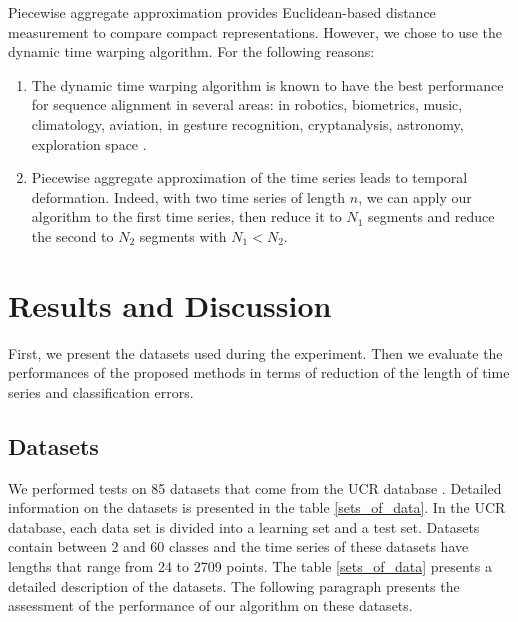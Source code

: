 Piecewise aggregate approximation provides Euclidean-based distance measurement to compare compact representations. However, we chose to use the dynamic time warping algorithm. For the following reasons:
\begin{enumerate}
\item The dynamic time warping algorithm  is known to have the best performance for sequence alignment in several areas:
in robotics, biometrics, music, climatology, aviation, in gesture recognition, cryptanalysis, astronomy, exploration
space \cite{Rakthanmanon2012}.
\item Piecewise aggregate approximation of the time series leads to temporal deformation. Indeed,
with two time series of length $ n $, we can apply our algorithm to the
 first time series, then reduce it to $ N_{1} $ segments and reduce the second to $ N_{2} $
 segments with $ N_{1} <N_{2} $.
\end{enumerate}


\section{Results and Discussion}
\label{results} 
 First, we present the datasets used during the experiment.
 Then we evaluate the performances of the proposed methods in terms of  reduction of the
 length of time series and classification errors.

\subsection{Datasets}

We performed tests on 85 datasets that come from the UCR database
\cite{UCRArchive} . Detailed information on the datasets is presented in
the table \ref{sets_of_data}.
 In the UCR database, each data set is divided into a learning set and a test set. Datasets contain between 2 and 60 classes and the time series of these datasets have lengths that range from 24 to 2709 points. The table \ref{sets_of_data} presents a
 detailed description of the datasets. The following paragraph presents the assessment of the performance of our algorithm on these datasets.
 
